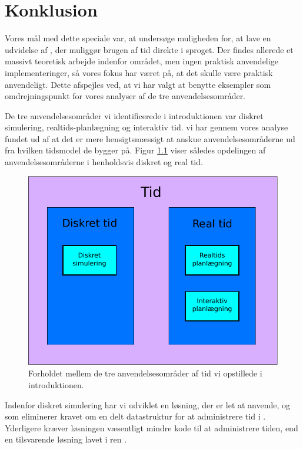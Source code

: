 \chapter{Konklusion} 
\label{chap:konklusion}

Vores mål med dette speciale var, at undersøge muligheden for, at lave en udvidelse af \pycsp, der muliggør brugen af tid direkte i sproget. Der findes allerede et massivt teoretisk arbejde indenfor området, men ingen praktisk anvendelige implementeringer, så vores fokus har været på, at det skulle være praktisk anvendeligt. Dette afspejles ved, at vi har valgt at benytte eksempler som omdrejningspunkt for vores analyser af de tre anvendelsesområder. 

De tre anvendelsesområder vi identificerede i introduktionen var diskret simulering, realtids-planlægning og interaktiv tid. vi har gennem vores analyse fundet ud af at det er mere hensigtsmæssigt at anskue anvendelsesområderne ud fra hvilken tidsmodel de bygger på. Figur \ref{fig:timemodel} viser således opdelingen af anvendelsesområderne i henholdsvis diskret og real tid.  

\begin{figure}[htp]
 \begin{center}
  \includegraphics[scale=0.6]{images/timemodel}
	\caption{Forholdet mellem de tre anvendelsesområder af tid vi opstillede i introduktionen.}
	\label{fig:timemodel}
\end{center}
\end{figure}

Indenfor diskret simulering har vi udviklet en løsning, der er let at anvende, og som eliminerer kravet om en delt datastruktur for at administrere tid i \pycsp. Yderligere kræver løsningen væsentligt mindre kode til at administrere tiden, end en tilsvarende løsning lavet i ren \pycsp. 

